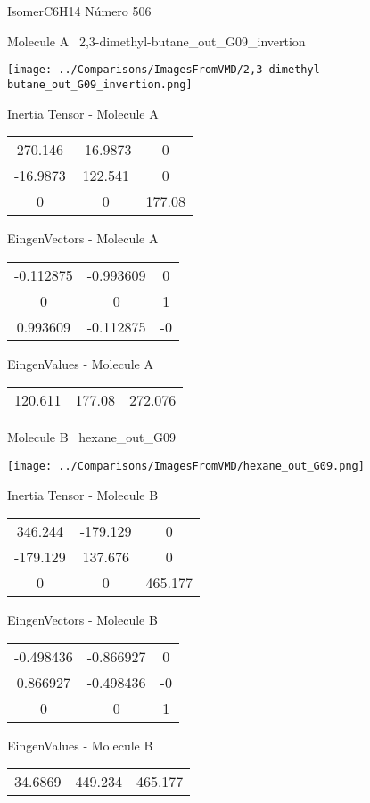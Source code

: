 \vtab[-3cm]
\begin{center}
{\large IsomerC6H14 \tab Número 506}
\end{center}
\begin{multicols}{2}
\begin{center}

Molecule A \
2,3-dimethyl-butane\_out\_G09\_invertion

\texttt{[image: ../Comparisons/ImagesFromVMD/2,3-dimethyl-butane\_out\_G09\_invertion.png]}

Inertia Tensor - Molecule A \\
\begin{tabular}{|c c c|}
270.146	 & 	-16.9873	 & 	0	 \\
-16.9873	 & 	122.541	 & 	0	 \\
0	 & 	0	 & 	177.08
\end{tabular}

\vtab
 EingenVectors - Molecule A     \\
\begin{tabular}{|c c c|}
-0.112875	 & 	-0.993609	 & 	0	 \\
0	 & 	0	 & 	1	 \\
0.993609	 & 	-0.112875	 & 	-0
\end{tabular}

\vtab
 EingenValues - Molecule A     \\
\begin{tabular}{|c c c|}
120.611	 & 	177.08	 & 	272.076	 \\
\end{tabular}
\columnbreak

Molecule B \
hexane\_out\_G09

\texttt{[image: ../Comparisons/ImagesFromVMD/hexane\_out\_G09.png]}

Inertia Tensor - Molecule B \\
\begin{tabular}{|c c c|}
346.244	 & 	-179.129	 & 	0	 \\
-179.129	 & 	137.676	 & 	0	 \\
0	 & 	0	 & 	465.177
\end{tabular}

\vtab
 EingenVectors - Molecule B     \\
\begin{tabular}{|c c c|}
-0.498436	 & 	-0.866927	 & 	0	 \\
0.866927	 & 	-0.498436	 & 	-0	 \\
0	 & 	0	 & 	1
\end{tabular}

\vtab
 EingenValues - Molecule B     \\
\begin{tabular}{|c c c|}
34.6869	 & 	449.234	 & 	465.177	 \\
\end{tabular}

\end{center}
\end{multicols}

